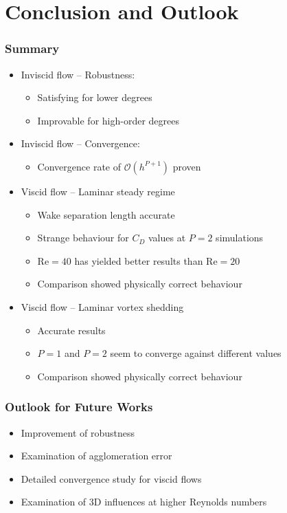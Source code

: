 \section{Conclusion and Outlook}
\frame{\tableofcontents[currentsection]}
		\begin{frame}
			\frametitle{Summary}
			\begin{itemize}
				\item Inviscid flow -- Robustness:
				\begin{itemize}
					\item Satisfying for lower degrees
					\item Improvable for high-order degrees 
				\end{itemize}
				\pause
				\item Inviscid flow -- Convergence:
				\begin{itemize}
					\item Convergence rate of $\mathcal{O}(h^{P+1})$ proven
				\end{itemize}
				\pause
				\item Viscid flow -- Laminar steady regime
				\begin{itemize}
					\item Wake separation length accurate
					\item Strange behaviour for $C_D$ values at $P=2$ simulations
					\item $\text{Re}=40$ has yielded better results than $\text{Re}=20$
					\item Comparison showed physically correct behaviour
				\end{itemize}
				\pause
				\item Viscid flow -- Laminar vortex shedding
				\begin{itemize}
					\item Accurate results
					\item $P=1$ and $P=2$ seem to converge against different values
					\item Comparison showed physically correct behaviour
				\end{itemize}
			\end{itemize}
		\end{frame}
		\begin{frame}
			\frametitle{Outlook for Future Works}
		
				\begin{itemize}
					\item Improvement of robustness
					\pause
					\item Examination of agglomeration error
					\pause
					\item Detailed convergence study for viscid flows
					\pause
					\item Examination of 3D influences at higher Reynolds numbers
				\end{itemize}
		\end{frame}
		
